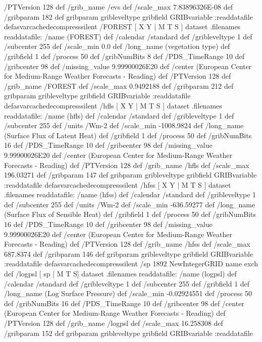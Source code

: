 \begin{ingrid}
{{ /PTVersion 128 def
 /grib_name /evs def
 /scale_max 7.83896326E-08 def
 /gribparam 182 def
 gribparam gribleveltype gribfield GRIBvariable
 :readdatafile
}defasvarcachedecompresssilent
 /FOREST{
[ X Y | M T S ] dataset .filenames readdatafile:
/name (FOREST) def
 /calendar /standard def
 /gribleveltype 1 def
 /subcenter 255 def
 /scale_min 0.0 def
 /long_name (vegetation type) def
 /gribfield 1 def
 /process 50 def
 /gribNumBits 8 def
 /PDS_TimeRange 10 def
 /gribcenter 98 def
 /missing_value 9.99900026E20 def
 /center (European Center for Medium-Range Weather Forecasts - Reading) def
 /PTVersion 128 def
 /grib_name /FOREST def
 /scale_max 0.9492188 def
 /gribparam 212 def
 gribparam gribleveltype gribfield GRIBvariable
 :readdatafile
}defasvarcachedecompresssilent
 /hfls{
[ X Y | M T S ] dataset .filenames readdatafile:
/name (hfls) def
 /calendar /standard def
 /gribleveltype 1 def
 /subcenter 255 def
 /units /Wm-2 def
 /scale_min -1008.9824 def
 /long_name (Surface Flux of Latent Heat) def
 /gribfield 1 def
 /process 50 def
 /gribNumBits 16 def
 /PDS_TimeRange 10 def
 /gribcenter 98 def
 /missing_value 9.99900026E20 def
 /center (European Center for Medium-Range Weather Forecasts - Reading) def
 /PTVersion 128 def
 /grib_name /hfls def
 /scale_max 196.03271 def
 /gribparam 147 def
 gribparam gribleveltype gribfield GRIBvariable
 :readdatafile
}defasvarcachedecompresssilent
 /hfss{
[ X Y | M T S ] dataset .filenames readdatafile:
/name (hfss) def
 /calendar /standard def
 /gribleveltype 1 def
 /subcenter 255 def
 /units /Wm-2 def
 /scale_min -636.59277 def
 /long_name (Surface Flux of Sensible Heat) def
 /gribfield 1 def
 /process 50 def
 /gribNumBits 16 def
 /PDS_TimeRange 10 def
 /gribcenter 98 def
 /missing_value 9.99900026E20 def
 /center (European Center for Medium-Range Weather Forecasts - Reading) def
 /PTVersion 128 def
 /grib_name /hfss def
 /scale_max 687.8374 def
 /gribparam 146 def
 gribparam gribleveltype gribfield GRIBvariable
 :readdatafile
}defasvarcachedecompresssilent
/sp 1892 NewIntegerGRID name exch def
 /logpsl{
[ sp | M T S] dataset .filenames readdatafile:
/name (logpsl) def
 /calendar /standard def
 /gribleveltype 1 def
 /subcenter 255 def
 /gribfield 1 def
 /long_name (Log Surface Pressure) def
 /scale_min -0.02924551 def
 /process 50 def
 /gribNumBits 16 def
 /PDS_TimeRange 10 def
 /gribcenter 98 def
 /center (European Center for Medium-Range Weather Forecasts - Reading) def
 /PTVersion 128 def
 /grib_name /logpsl def
 /scale_max 16.258308 def
 /gribparam 152 def
 gribparam gribleveltype gribfield GRIBvariable
 :readdatafile
}}
\end{ingrid}
